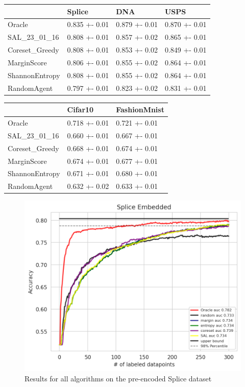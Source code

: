 \documentclass[]{article}
\begin{document}
\begin{table}[]
	\begin{tabular}{l|lll}
		& Splice        & DNA           & USPS          \\
		\hline
		Oracle          & 0.835 +- 0.01 & 0.879 +- 0.01 & 0.870 +- 0.01 \\
		SAL\_23\_01\_16 & 0.808 +- 0.01 & 0.857 +- 0.02 & 0.865 +- 0.01 \\
		Coreset\_Greedy & 0.808 +- 0.01 & 0.853 +- 0.02 & 0.849 +- 0.01 \\
		MarginScore     & 0.806 +- 0.01 & 0.855 +- 0.02 & 0.864 +- 0.01 \\
		ShannonEntropy  & 0.808 +- 0.01 & 0.855 +- 0.02 & 0.864 +- 0.01 \\
		RandomAgent     & 0.797 +- 0.01 & 0.823 +- 0.02 & 0.831 +- 0.01
	\end{tabular}
\end{table}
%
\begin{table}[]
	\begin{tabular}{l|ll}
		& Cifar10 & FashionMnist \\
		\hline
		Oracle          & 0.718 +- 0.01  & 0.721 +- 0.01       \\
		SAL\_23\_01\_16 & 0.660 +- 0.01  & 0.667 +- 0.01       \\
		Coreset\_Greedy & 0.668 +- 0.01  & 0.674 +- 0.01       \\
		MarginScore     & 0.674 +- 0.01  & 0.677 +- 0.01       \\
		ShannonEntropy  & 0.671 +- 0.01  & 0.680 +- 0.01       \\
		RandomAgent     & 0.632 +- 0.02  & 0.633 +- 0.01      
	\end{tabular}
\end{table}
%
\begin{figure}[H]
	\centering
	\includegraphics[width=0.8\linewidth]{img/eval_splice_embedded}
	\caption{Results for all algorithms on the pre-encoded Splice dataset}
\end{figure}
\end{document}
